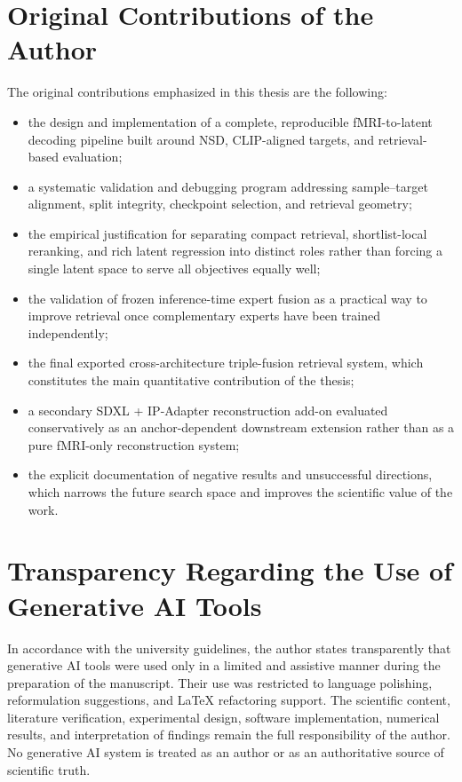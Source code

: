 \section{Original Contributions of the Author}

The original contributions emphasized in this thesis are the following:
\begin{itemize}
    \item the design and implementation of a complete, reproducible fMRI-to-latent decoding pipeline built around NSD, CLIP-aligned targets, and retrieval-based evaluation;
    \item a systematic validation and debugging program addressing sample--target alignment, split integrity, checkpoint selection, and retrieval geometry;
    \item the empirical justification for separating compact retrieval, shortlist-local reranking, and rich latent regression into distinct roles rather than forcing a single latent space to serve all objectives equally well;
    \item the validation of frozen inference-time expert fusion as a practical way to improve retrieval once complementary experts have been trained independently;
    \item the final exported cross-architecture triple-fusion retrieval system, which constitutes the main quantitative contribution of the thesis;
    \item a secondary SDXL + IP-Adapter reconstruction add-on evaluated conservatively as an anchor-dependent downstream extension rather than as a pure fMRI-only reconstruction system;
    \item the explicit documentation of negative results and unsuccessful directions, which narrows the future search space and improves the scientific value of the work.
\end{itemize}

\section{Transparency Regarding the Use of Generative AI Tools}

In accordance with the university guidelines, the author states transparently that generative AI tools were used only in a limited and assistive manner during the preparation of the manuscript. Their use was restricted to language polishing, reformulation suggestions, and LaTeX refactoring support. The scientific content, literature verification, experimental design, software implementation, numerical results, and interpretation of findings remain the full responsibility of the author. No generative AI system is treated as an author or as an authoritative source of scientific truth.

